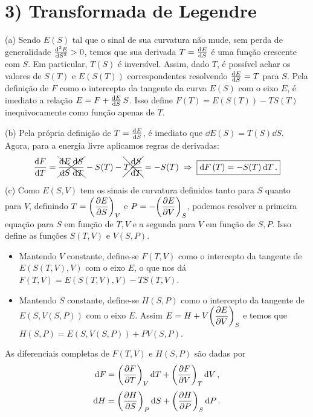 \documentclass[a4paper,10pt]{article}
\begin{document}
\pagebreak

\section*{3) Transformada de Legendre}

(a) Sendo $E(S)$ tal que o sinal de sua curvatura não mude, sem perda de generalidade $\dv[2]{E}{S} > 0$, temos que sua derivada $T = \dv{E}{S}$ é uma função crescente com $S$. Em particular, $T(S)$ é inversível. Assim, dado $T$, é possível achar os valores de $S(T)$ e $E(S(T))$ correspondentes resolvendo $\dv{E}{S} = T$ para $S$. Pela definição de $F$ como o intercepto da tangente da curva $E(S)$ com o eixo $E$, é imediato a relação $E = F + \dv{E}{S} \, S$. Isso define $F(T) = E(S(T)) - T S(T)$ inequivocamente como função apenas de $T$.

\n\n

(b) Pela própria definição de $T = \dv{E}{S}$, é imediato que $\dd{E}(S) = T(S) \dd{S}$. Agora, para a energia livre aplicamos regras de derivadas:
$$
\dv{F}{T} = \xcancel{\dv{E}{S} \dv{S}{T}} - S(T) - \xcancel{T \dv{S}{T}} = -S(T) \; \Rightarrow \; \boxed{\dd{F}(T) = -S(T) \dd{T}.}
$$

\n\n

(c) Como $E(S,V)$ tem os sinais de curvatura definidos tanto para $S$ quanto para $V$, definindo $\displaystyle{ T = \qty(\pdv{E}{S})_V }$ e $\displaystyle{P = - \qty(\pdv{E}{V})_S}$, podemos resolver a primeira equação para $S$ em função de $T, V$ e a segunda para $V$ em função de $S, P$. Isso define as funções $S(T,V)$ e $V(S,P)$.

\begin{itemize}
\item Mantendo $V$ constante, define-se $F(T,V)$ como o intercepto da tangente de $E(S(T,V), V)$ com o eixo $E$, o que nos dá $\boxed{ F(T,V) = E(S(T,V), V) - T S(T,V) }$.

\item Mantendo $S$ constante, define-se $H(S,P)$ como o intercepto da tangente de $E(S, V(S,P))$ com o eixo $E$. Assim $\displaystyle{E = H + V \qty(\pdv{E}{V})_S}$ e temos que $\boxed{ H(S,P) = E(S, V(S,P)) + P V(S,P) }$.
\end{itemize}

\n

As diferenciais completas de $F(T,V)$ e $H(S, P)$ são dadas por
$$
\dd{F} = \qty(\pdv{F}{T})_{V} \dd{T} + \qty(\pdv{F}{V})_{T} \dd{V},
$$
$$
\dd{H} = \qty(\pdv{H}{S})_{P} \dd{S} + \qty(\pdv{H}{P})_{S} \dd{P}.
$$
\end{document}
